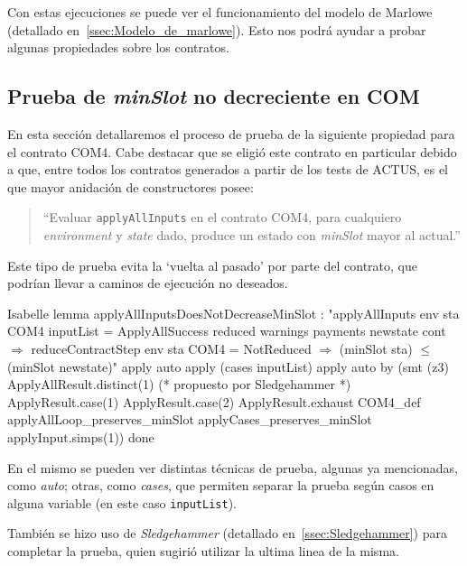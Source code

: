 \documentclass[12pt]{book}
\begin{document}
Con estas ejecuciones se puede ver el funcionamiento del modelo de Marlowe (detallado en~\ref{ssec:Modelo_de_marlowe}). Esto nos podrá ayudar a probar algunas propiedades sobre los contratos.

\subsection{Prueba de \textit{minSlot} no decreciente en COM}

En esta sección detallaremos el proceso de prueba de la siguiente propiedad para el contrato COM4. Cabe destacar que se eligió este contrato en particular debido a que, entre todos los contratos generados a partir de los tests de ACTUS, es el que mayor anidación de constructores posee:

\begin{quote} 
``Evaluar \texttt{applyAllInputs} en el contrato COM4, para cualquiero \textit{environment} y \textit{state} dado, produce un estado con \textit{minSlot} mayor al actual.''
\end{quote}

Este tipo de prueba evita la `vuelta al pasado' por parte del contrato, que podrían llevar a caminos de ejecución no deseados.

\begin{code}[title=Prueba del lema de \textit{minSlot} no decreciente para un contrato COM.]{Isabelle}
lemma applyAllInputsDoesNotDecreaseMinSlot :
"applyAllInputs env sta COM4 inputList = 
    ApplyAllSuccess reduced warnings payments newstate cont $\Longrightarrow$
    reduceContractStep env sta COM4 = NotReduced $\Longrightarrow$
  (minSlot sta) $\leq$ (minSlot newstate)"
  apply auto
  apply (cases inputList)
  apply auto 
  by (smt (z3) ApplyAllResult.distinct(1) (* propuesto por Sledgehammer *)
                  ApplyResult.case(1)
                  ApplyResult.case(2)
                  ApplyResult.exhaust
                  COM4_def
                  applyAllLoop_preserves_minSlot
                  applyCases_preserves_minSlot applyInput.simps(1))
  done
\end{code}

En el mismo se pueden ver distintas técnicas de prueba, algunas ya mencionadas, como \textit{auto}; otras, como \textit{cases}, que permiten separar la prueba según casos en alguna variable (en este caso \texttt{inputList}).

También se hizo uso de \textit{Sledgehammer} (detallado en~\ref{ssec:Sledgehammer}) para completar la prueba, quien sugirió utilizar la ultima linea de la misma.
\end{document}

